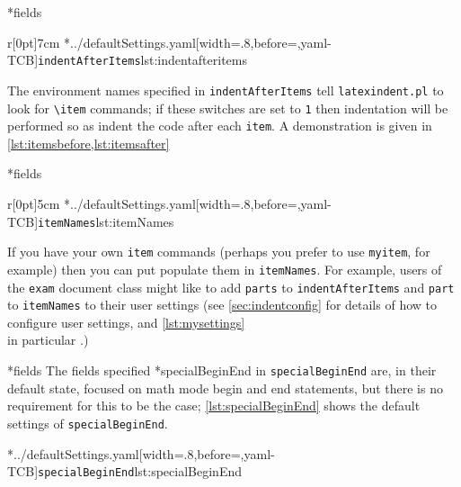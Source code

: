 *{fields}
	\begin{wrapfigure}[5]{r}[0pt]{7cm}
		\cmhlistingsfromfile[style=indentAfterItems]*{../defaultSettings.yaml}[width=.8\linewidth,before=\centering,yaml-TCB]{\texttt{indentAfterItems}}{lst:indentafteritems}
	\end{wrapfigure}
	The environment names specified in \texttt{indentAfterItems}  tell
	\texttt{latexindent.pl} to look for \lstinline!\item! commands; if these switches are set to \texttt{1}
	then indentation will be performed so as indent the code after each \texttt{item}.
	A demonstration is given in \cref{lst:itemsbefore,lst:itemsafter}

	\begin{minipage}{.45\textwidth}
	\end{minipage}%
	\hfill
	\begin{minipage}{.45\textwidth}
	\end{minipage}

*{fields}
	\begin{wrapfigure}[5]{r}[0pt]{5cm}
		\cmhlistingsfromfile[style=itemNames]*{../defaultSettings.yaml}[width=.8\linewidth,before=\centering,yaml-TCB]{\texttt{itemNames}}{lst:itemNames}
	\end{wrapfigure}
	If you have your own \texttt{item} commands (perhaps you
	prefer to use \texttt{myitem}, for example)
	then you can put populate them in \texttt{itemNames}.
	For example, users of the \texttt{exam} document class might like to add
	\texttt{parts} to \texttt{indentAfterItems} and \texttt{part} to \texttt{itemNames}
	to their user settings (see \vref{sec:indentconfig} for details of how to configure user settings,
	and \vref{lst:mysettings} \\ in particular \label{page:examsettings}.)

*{fields}\label{yaml:specialBeginEnd}
	The fields specified%
	*{specialBeginEnd} in \texttt{specialBeginEnd} are, in their default state, focused on math mode begin and end statements, but
	there is no requirement for this to be the case; \cref{lst:specialBeginEnd} shows the
	default settings of \texttt{specialBeginEnd}.

	\cmhlistingsfromfile[style=specialBeginEnd]*{../defaultSettings.yaml}[width=.8\linewidth,before=\centering,yaml-TCB]{\texttt{specialBeginEnd}}{lst:specialBeginEnd}

